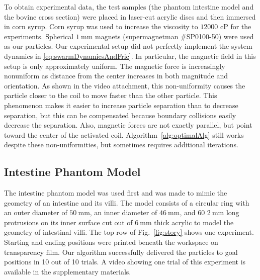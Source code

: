 To obtain experimental data, the test samples (the phantom intestine model and the bovine cross section) were placed in laser-cut acrylic discs and then immersed in corn syrup. Corn syrup was used to increase the viscosity to $12000$ cP for the experiments. Spherical $\SI{1}{\milli\metre}$ magnets (supermagnetman \#SP0100-50) were used as our particles. Our experimental setup did not perfectly implement the system dynamics in \eqref{eq:swarmDynamicsAndFric}. In particular, the magnetic field in this setup is only approximately uniform. The magnetic force is increasingly nonuniform as distance from the center increases in both magnitude and orientation. As shown in the video attachment, this non-uniformity causes the particle closer to the coil to move faster than the other particle. This phenomenon makes it easier to increase particle separation than to decrease separation, but this can be compensated because boundary collisions easily decrease the separation. Also, magnetic forces are not exactly parallel, but point toward the center of the activated coil. Algorithm~\ref{alg:optimalAlg} still works despite these non-uniformities, but sometimes requires additional iterations.
 


\subsection{Intestine Phantom Model}

The intestine phantom model was used first and was made to mimic the geometry of an intestine and its villi. The model consists of a circular ring with an outer diameter of $\SI{50}{\milli\metre}$, an inner diameter of $\SI{46}{\milli\metre}$, and 60 $\SI{2}{\milli\metre}$ long protrusions on its inner surface cut out of $\SI{6}{\milli\metre}$ thick acrylic to model the geometry of intestinal villi. The top row of Fig.~\ref{fig:story}  shows one experiment. Starting and ending positions were printed beneath the workspace on transparency film. Our algorithm successfully delivered the particles to goal positions in 10 out of 10 trials.
A video showing one trial of this experiment is available in the supplementary materials. 





